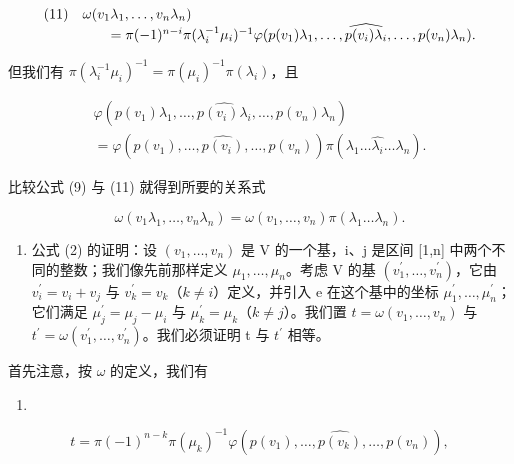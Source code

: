 \[
\begin{array}{l l} (1 1) & \omega (v _ {1} \lambda_ {1}, \ldots , v _ {n} \lambda_ {n}) \\ & \qquad = \pi (- 1) ^ {n - i} \pi (\lambda_ {i} ^ {- 1} \mu_ {i}) ^ {- 1} \varphi (p (v _ {1}) \lambda_ {1}, \ldots , \widehat {p (v _ {i}) \lambda_ {i}}, \ldots , p (v _ {n}) \lambda_ {n}). \end{array}
\]

但我们有 \(\pi (\lambda_i^{-1}\mu_i)^{-1} = \pi (\mu_i)^{-1}\pi (\lambda_i)\)，且

\[
\begin{array}{c} \varphi (p (v _ {1}) \lambda_ {1}, \ldots , \widehat {p (v _ {i}) \lambda_ {i}}, \ldots , p (v _ {n}) \lambda_ {n}) \\ = \varphi (p (v _ {1}), \ldots , \widehat {p (v _ {i})}, \ldots , p (v _ {n})) \pi (\lambda_ {1} \ldots \widehat {\lambda_ {i}} \ldots \lambda_ {n}). \end{array}
\]

比较公式 (9) 与 (11) 就得到所要的关系式

\[
\omega (v _ {1} \lambda_ {1}, \ldots , v _ {n} \lambda_ {n}) = \omega (v _ {1}, \ldots , v _ {n}) \pi (\lambda_ {1} \ldots \lambda_ {n}).
\]

\begin{enumerate}
\def\labelenumi{\Alph{enumi})}
\setcounter{enumi}{3}
\tightlist
\item
  公式 (2) 的证明：设 \((v_{1},\ldots,v_{n})\) 是 V 的一个基，i、j 是区间 {[}1,n{]} 中两个不同的整数；我们像先前那样定义 \(\mu_{1},\ldots,\mu_{n}\)。考虑 V 的基 \((v_{1}^{\prime},\ldots,v_{n}^{\prime})\)，它由 \(v_{i}^{\prime}=v_{i}+v_{j}\) 与 \(v_{k}^{\prime}=v_{k}\)（\(k\neq i\)）定义，并引入 e 在这个基中的坐标 \(\mu_{1}^{\prime},\ldots,\mu_{n}^{\prime}\)；它们满足 \(\mu_{j}^{\prime}=\mu_{j}-\mu_{i}\) 与 \(\mu_{k}^{\prime}=\mu_{k}\)（\(k\neq j\)）。我们置 \(t=\omega(v_{1},\ldots,v_{n})\) 与 \(t^{\prime}=\omega(v_{1}^{\prime},\ldots,v_{n}^{\prime})\)。我们必须证明 t 与 \(t^{\prime}\) 相等。
\end{enumerate}

首先注意，按 \(\omega\) 的定义，我们有

\begin{enumerate}
\def\labelenumi{(\arabic{enumi})}
\setcounter{enumi}{11}
\tightlist
\item
\end{enumerate}

\[
t = \pi (- 1) ^ {n - k} \pi (\mu_ {k}) ^ {- 1} \varphi (p (v _ {1}), \ldots , \widehat {p (v _ {k})}, \ldots , p (v _ {n})),\tag{13}
\]

